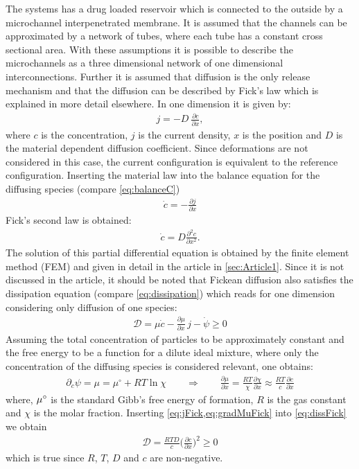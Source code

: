 The systems has a drug loaded reservoir which is connected to the outside by a microchannel interpenetrated membrane. It is assumed that the channels can be approximated by a network of tubes, where each tube has a constant cross sectional area. With these assumptions it is possible to describe the microchannels as a three dimensional network of one dimensional interconnections. Further it is assumed that diffusion is the only release mechanism and that the diffusion can be described by Fick's law which is explained in more detail elsewhere\supercite{taylor_multicomponent_1993}. In one dimension it is given by: 
\begin{align}
  j = -D \ \frac{\partial c}{\partial x}, \label{eq:jFick}
\end{align}
where $c$ is the concentration, $j$ is the current density, $x$ is the position and $D$ is the material dependent diffusion coefficient. Since deformations are not considered in this case, the current configuration is equivalent to the reference configuration. Inserting the material law into the balance equation for the diffusing species (compare \cref{eq:balanceC})
\begin{align}
  \dot c = - \frac{\partial j}{\partial x}
\end{align}
Fick's second law is obtained: 
\begin{align}
  \dot c = D \frac{\partial^2 c}{\partial x^2}.
\end{align}
The solution of this partial differential equation is obtained by the finite element method (FEM) and given in detail in the article in \cref{sec:Article1}. Since it is not discussed in the article, it should be noted that Fickean diffusion also satisfies the dissipation equation (compare \cref{eq:dissipation}) which reads for one dimension considering only diffusion of one species:
\begin{align}
  \mathcal{D} = \mu \dot c - \frac{\partial \mu}{\partial x} \, j - \dot \psi \geq 0 \label{eq:dissFick}
\end{align} 
Assuming the total concentration of particles to be approximately constant and the free energy to be a function for a dilute ideal mixture, where only the concentration of the diffusing species is considered relevant, one obtains:
\begin{align}
  \partial_c \psi = \mu = \mu^{\circ} + R T \ln{\chi} \qquad \Rightarrow \qquad \frac{\partial \mu}{\partial x} = \frac{R T}{\chi} \frac{\partial \chi}{\partial x} \approx \frac{RT}{c} \frac{\partial c}{\partial x} \label{eq:gradMuFick}
\end{align}
where, $\mu^{\circ}$ is the standard Gibb's free energy of formation, $R$ is the gas constant and $\chi$ is the molar fraction. Inserting \cref{eq:jFick,eq:gradMuFick} into \cref{eq:dissFick} we obtain
\begin{align}
  \mathcal{D} = \frac{RTD}{c} \bigg(\frac{\partial c}{\partial x}\bigg)^2 \geq 0
\end{align}
which is true since $R$, $T$, $D$ and $c$ are non-negative.

